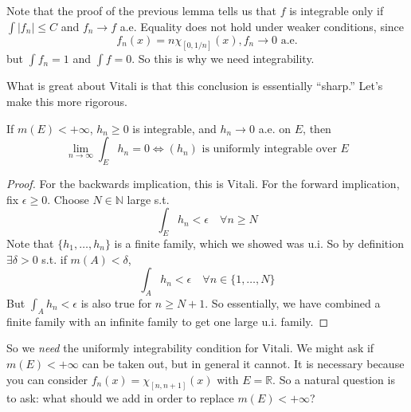   Note that the proof of the previous lemma tells us that $f$ is integrable only if $\int |f_n| \leq C$ and $f_n \to f$ a.e. Equality does not hold under weaker conditions, since 
  \begin{equation}
    f_n (x) = n \chi_{[0, 1/n]} (x), f_n \to 0 \text{ a.e.}
  \end{equation}
  but $\int f_n = 1$ and $\int f = 0$. So this is why we need integrability. 

  What is great about Vitali is that this conclusion is essentially ``sharp.'' Let's make this more rigorous. 

  \begin{theorem}
    \label{thm:vanishing-integrals-for-a-null-sequence}
    If $m(E) < +\infty$, $h_n \geq 0$ is integrable, and $h_n \to 0$ a.e. on $E$, then 
    \begin{equation}
      \lim_{n \to \infty} \int_E h_n = 0 \iff (h_n) \text{ is uniformly integrable over } E
    \end{equation}
  \end{theorem}
  \begin{proof}
    For the backwards implication, this is Vitali. For the forward implication, fix $\epsilon \geq 0$. Choose $N \in \mathbb{N}$ large s.t. 
    \begin{equation}
      \int_E h_n < \epsilon \quad \forall n \geq N
    \end{equation}
    Note that $\{h_1, \ldots, h_n\}$ is a finite family, which we showed was u.i. So by definition $\exists \delta > 0$ s.t. if $m(A) < \delta$, 
    \begin{equation}
      \int_A h_n < \epsilon \quad \forall n \in \{1, \ldots, N\} 
    \end{equation}
    But $\int_A h_n < \epsilon$ is also true for $n \geq N +1$. So essentially, we have combined a finite family with an infinite family to get one large u.i. family. 
  \end{proof}

  So we \textit{need} the uniformly integrability condition for Vitali. We might ask if $m(E) < +\infty$ can be taken out, but in general it cannot. It is necessary because you can consider $f_n(x) = \chi_{[n, n+1]} (x)$ with $E = \mathbb{R}$. So a natural question is to ask: what should we add in order to replace $m(E) < +\infty$? 

